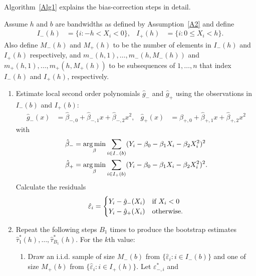 \documentclass[12pt,fleqn]{article}
\begin{document}
Algorithm~\ref{Alg1} explains the bias-correction steps in detail.

\begin{algorithm}\label{Alg1}
  Assume $h$ and $b$ are bandwidths as defined by Assumption~\ref{A2} and define
  \begin{align*}
    I_{-}(h) &= \{i : -h < X_{i} < 0\}, &
    I_{+}(h) &= \{i : 0 \leq X_{i} < h\}.
  \end{align*}
  Also define $M_{-}(h)$ and $M_{+}(h)$ to be the number of elements in $I_{-}(h)$ and
  $I_{+}(h)$ respectively, and $m_{-}(h,1),\dots,m_{-}(h,M_{-}(h))$ and
  $m_{+}(h,1),\dots,m_{+}(h,M_+(h))$ to be subsequences of $1,\dots,n$ that index
  $I_{-}(h)$ and $I_{+}(h)$, respectively.
  \begin{enumerate}
  \item Estimate local second order polynomials $\hat g_{-}$ and $\hat g_{+}$ using
    the observations in $I_{-}(b)$ and $I_{+}(b)$:
    \begin{align}
      \label{eq:2}
      \hat g_{-}(x)
      &= \hat\beta_{-,0} + \hat\beta_{-,1} x + \hat\beta_{-,2} x^{2},
      &\hat g_{+}(x)
      &= \hat\beta_{+,0} + \hat\beta_{+,1} x + \hat\beta_{+,2} x^{2}
    \end{align}
    with
    \begin{align*}
      \hat\beta_{-} &= \operatorname*{arg\,min}_\beta \sum_{i \in I_-(b)}
      (Y_i - \beta_0 - \beta_1 X_i - \beta_2 X_i^2)^2 \\
      \hat\beta_{+} &= \operatorname*{arg\,min}_\beta \sum_{i \in I_+(b)}
      (Y_i - \beta_0 - \beta_1 X_i - \beta_2 X_i^2)^2.
    \end{align*}
    Calculate the residuals
    \begin{equation}
      \label{eq:3}
      \hat\varepsilon_{i} =
      \begin{cases}
        Y_{i} - \hat g_-(X_{i}) & \text{if}\ X_{i} < 0 \\
        Y_{i} - \hat g_+(X_{i}) & \text{otherwise}.
      \end{cases}
    \end{equation}
  \item Repeat the following steps $B_{1}$ times to produce the
    bootstrap estimates $\hat{\tau}_{1}^{*}(h),\dots,\hat\tau_{B_{1}}^{*}(h)$. For the
    $k$th value:
    \begin{enumerate}
    \item Draw an i.i.d. sample of size $M_-(b)$ from
      $\{\hat\varepsilon_i : i \in I_-(b)\}$ and one of size $M_+(b)$ from
      $\{\hat\varepsilon_i : i \in I_+(h)\}$. Let $\varepsilon_{-,i}^{*}$ and

\end{enumerate}
\end{enumerate}
\end{algorithm}
\end{document}
